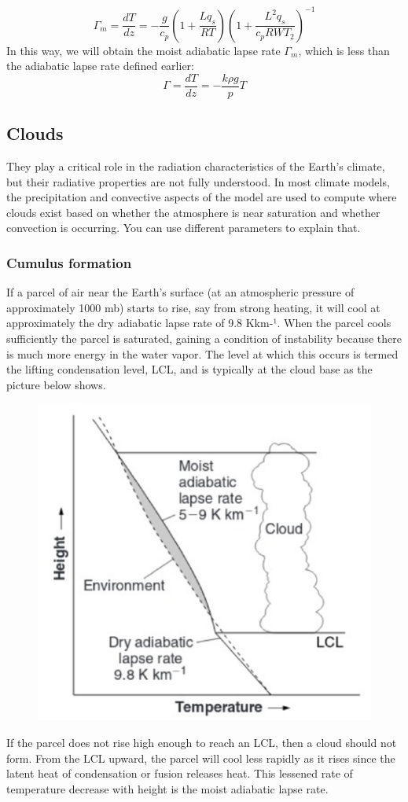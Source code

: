 \begin{equation}\label{eq.adiabatic lapse rate}
	\Gamma_m= \frac{dT}{dz} = -\frac{g}{c_p} \left( 1 + \frac{L q_s}{R T} \right) \left( 1 + \frac{L^2 q_s}{c_p R W T_2} \right)^{-1}
\end{equation}
In this way, we will obtain the moist adiabatic lapse rate $\Gamma_m$, which is less than the adiabatic lapse rate defined earlier: $$\Gamma=\frac{dT}{dz}=-\frac{k\rho g}{p}T$$



\subsection{Clouds}
They play a critical role in the radiation characteristics of the Earth's climate, but their radiative properties are not fully understood. In most climate models, the precipitation and convective aspects of the model are used to compute where clouds exist based on whether the atmosphere is near saturation and whether convection is occurring. You can use different parameters to explain that.

\subsubsection{Cumulus formation}
If a parcel of air near the Earth's surface (at an atmospheric pressure of approximately 1000 mb) starts to rise, say from strong heating, it will cool at approximately the dry adiabatic lapse rate of 9.8 Kkm-¹. When the parcel cools sufficiently the parcel is saturated, gaining a condition of instability because there is much more energy in the water vapor. The level at which this occurs is termed the lifting condensation level, LCL, and is typically at the cloud base as the picture below shows.
\begin{figure}[htpb]
	\centering
	\includegraphics[width=0.4\linewidth]{upload/image14.png}

\end{figure}
If the parcel does not rise high enough to reach an LCL, then a cloud should not form. From the LCL upward, the parcel will cool less rapidly as it rises since the latent heat of condensation or fusion releases heat. This lessened rate of temperature decrease with height is the moist adiabatic lapse rate.

